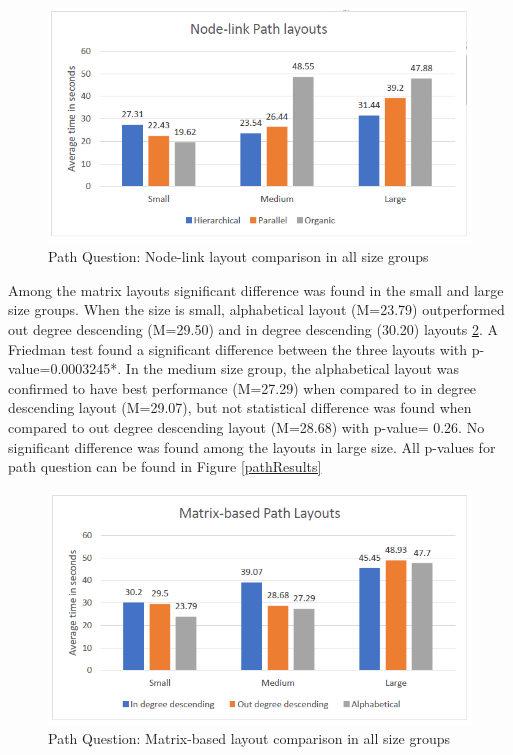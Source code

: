 \documentclass{l4proj}
\begin{document}
\begin{figure}[H]
\centering
\includegraphics[width=15cm]{images/nodePathLayouts.PNG}
\caption{Path Question: Node-link layout comparison in all size groups}
\label{nodePathLayouts}
\end{figure}

Among the matrix layouts significant difference was found in the small and large size groups. When the size is small, alphabetical layout (M=23.79) outperformed out degree descending (M=29.50) and in degree descending (30.20) layouts \ref{matrixpathlayouts}. A Friedman test found a significant difference between the three layouts with p-value=0.0003245*. In the medium size group, the alphabetical layout was confirmed to have best performance (M=27.29) when compared to in degree descending layout (M=29.07), but not statistical difference was found when compared to out degree descending layout (M=28.68) with p-value= 0.26. No significant difference was found among the layouts in large size. All p-values for path question can be found in Figure \ref{pathResults} 


\begin{figure}[H]
\centering
\includegraphics[width=15cm]{images/matrixpathlayouts.PNG}
\caption{Path Question: Matrix-based layout comparison in all size groups}
\label{matrixpathlayouts}
\end{figure}
\end{document}
